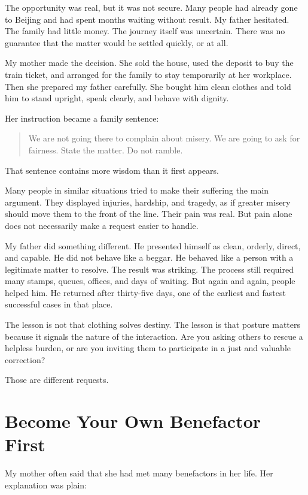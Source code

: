 The opportunity was real, but it was not secure. Many people had already gone to Beijing and had spent months waiting without result. My father hesitated. The family had little money. The journey itself was uncertain. There was no guarantee that the matter would be settled quickly, or at all.

My mother made the decision. She sold the house, used the deposit to buy the train ticket, and arranged for the family to stay temporarily at her workplace. Then she prepared my father carefully. She bought him clean clothes and told him to stand upright, speak clearly, and behave with dignity.

Her instruction became a family sentence:

\begin{quote}
We are not going there to complain about misery. We are going to ask for fairness. State the matter. Do not ramble.
\end{quote}

That sentence contains more wisdom than it first appears.

Many people in similar situations tried to make their suffering the main argument. They displayed injuries, hardship, and tragedy, as if greater misery should move them to the front of the line. Their pain was real. But pain alone does not necessarily make a request easier to handle.

My father did something different. He presented himself as clean, orderly, direct, and capable. He did not behave like a beggar. He behaved like a person with a legitimate matter to resolve. The result was striking. The process still required many stamps, queues, offices, and days of waiting. But again and again, people helped him. He returned after thirty-five days, one of the earliest and fastest successful cases in that place.

The lesson is not that clothing solves destiny. The lesson is that posture matters because it signals the nature of the interaction. Are you asking others to rescue a helpless burden, or are you inviting them to participate in a just and valuable correction?

Those are different requests.

\section*{Become Your Own Benefactor First}

My mother often said that she had met many benefactors in her life. Her explanation was plain:

